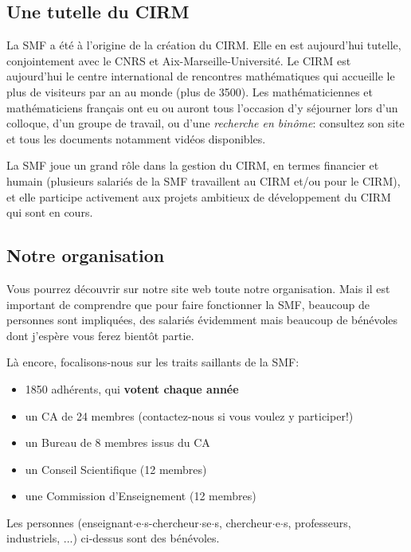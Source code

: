 \subsection{Une tutelle du CIRM}  La SMF a \'{e}t\'{e} \`{a} l'origine de la cr\'{e}ation du CIRM. Elle en est aujourd'hui tutelle, conjointement avec le CNRS et Aix-Marseille-Universit\'e. Le CIRM est aujourd'hui le centre international de rencontres math\'{e}matiques qui accueille le plus de visiteurs par an au monde (plus de 3500). Les math\'{e}maticiennes et math\'ematiciens fran\c{c}ais ont eu ou auront tous l'occasion d'y s\'{e}journer lors d'un colloque, d'un groupe de travail, ou d'une {\sl recherche en bin\^{o}me}: consultez   son site  et tous les documents notamment vid\'eos disponibles.

La SMF joue un grand r\^ole dans la gestion du CIRM, en termes financier et humain (plusieurs salari\'es de la SMF travaillent au CIRM et/ou pour le CIRM), et elle participe activement aux projets ambitieux de d\'eveloppement du CIRM qui sont en cours.
 
 
 

\subsection{Notre organisation}

Vous pourrez d\'ecouvrir sur notre site web toute notre organisation. Mais il est important de comprendre que pour faire fonctionner la SMF, beaucoup de personnes sont impliqu\'ees, des salari\'es \'evidemment mais beaucoup de b\'en\'evoles dont j'esp\`ere vous ferez bient\^ot partie. 

L\`a encore, focalisons-nous sur les traits saillants de la SMF:
\begin{itemize}
\item
1850 adh\'erents, qui {\bf votent chaque ann\'ee}
 
 
\item un CA de 24 membres (contactez-nous si vous voulez y participer!)
\item un Bureau de 8 membres issus du CA
\item un Conseil Scientifique (12 membres)
 
\item une Commission d'Enseignement (12 membres)


\end{itemize}
Les personnes (enseignant$\cdot$e$\cdot$s-chercheur$\cdot$se$\cdot$s, chercheur$\cdot$e$\cdot$s, professeurs, industriels, ...) ci-dessus sont des b\'en\'evoles.


